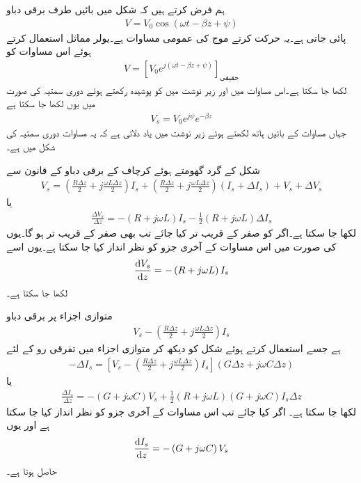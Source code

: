 ہم فرض کرتے ہیں کہ شکل  میں بائیں طرف برقی دباو
\begin{align*}
V=V_0 \cos (\omega t -\beta z +\psi)
\end{align*}
پائی جاتی ہے۔یہ حرکت کرتے موج کی عمومی مساوات ہے۔یولر مماثل استعمال کرتے ہوئے اس مساوات کو
\begin{align*}
V=\left[ V_0 e^{j(\omega t -\beta z +\psi)}\right]_{\text{حقیقی}}
\end{align*}
لکھا جا سکتا ہے۔اس مساوات میں  اور زیر نوشت میں  کو پوشیدہ رکھتے ہوئے دوری سمتیہ کی صورت میں یوں لکھا جا سکتا ہے
\begin{align*}
V_s =V_0 e^{j \psi} e^{-\beta z}
\end{align*}
جہاں مساوات کے بائیں ہاتھ  لکھتے ہوئے زیر نوشت میں  یاد دلاتی ہے کہ یہ مساوات دوری سمتیہ کی شکل میں ہے۔ 

شکل  کے گرد گھومتے ہوئے کرچاف کے برقی دباو کے قانون سے
\begin{align*}
V_s=\left(\frac{R\Delta z}{2} + j \frac{\omega L \Delta z}{2}\right) I_s+\left(\frac{R\Delta z}{2} + j \frac{\omega L \Delta z}{2}\right) \left(I_s+\Delta I_s \right)+V_s+\Delta V_s
\end{align*}
یا
\begin{align*}
\frac{\Delta V_s}{\Delta z} =-\left(R+j\omega L \right) I_s-\frac{1}{2}\left(R+j\omega L \right)\Delta I_s
\end{align*}
لکھا جا سکتا ہے۔اگر  کو صفر کے قریب تر کیا جائے تب  بھی صفر کے قریب تر ہو گا۔یوں  کی صورت میں اس مساوات کے آخری جزو کو نظر انداز کیا جا سکتا ہے۔یوں اسے
\begin{align}\label{مساوات_ترسیل_دباو_تفرقی_مساوات}
\frac{\dif V_s}{\dif z}=-\left(R+j\omega L \right) I_s
\end{align}
لکھا جا سکتا ہے۔

متوازی اجزاء پر برقی دباو
\begin{align*}
V_s-\left(\frac{R \Delta z}{2}+j\frac{\omega L \Delta z}{2} \right) I_s
\end{align*}
ہے جسے استعمال کرتے ہوئے شکل کو دیکھ کر متوازی اجزاء میں تفرقی رو کے لئے
\begin{align*}
-\Delta I_s = \left[V_s-\left(\frac{R \Delta z}{2}+j\frac{\omega L \Delta z}{2} \right) I_s \right] \left(G \Delta z+j \omega C \Delta z \right)
\end{align*}
یا
\begin{align*}
\frac{\Delta I_s}{\Delta z}=-\left(G+j \omega C \right) V_s +\frac{1}{2}\left(R+j \omega L \right)\left(G+j \omega C \right) I_s \Delta z
\end{align*}
لکھا جا سکتا ہے۔ اگر  کیا جائے تب اس مساوات کے آخری جزو کو نظر انداز کیا جا سکتا ہے اور یوں
\begin{align}\label{مساوات_ترسیل_رو_تفرقی_مساوات}
\frac{\dif I_s}{\dif z}=-\left(G+j \omega C \right) V_s
\end{align}
 حاصل ہوتا ہے۔

